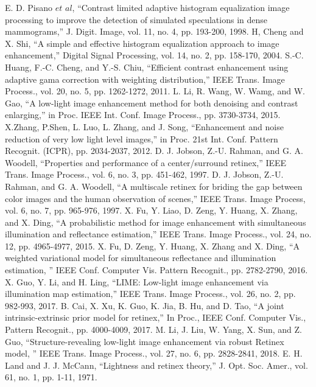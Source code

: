 \begin{thebibliography}{99}
 E. D. Pisano $et$ $al$, ``Contrast limited adaptive histogram equalization image processing to improve the detection of simulated speculations in dense mammograms,'' J. Digit. Image, vol. 11, no. 4, pp. 193-200, 1998.
 H, Cheng and X. Shi, ``A simple and effective histogram equalization approach to image enhancement,'' Digital Signal Processing, vol. 14, no. 2, pp. 158-170, 2004.
 S.-C. Huang, F.-C. Cheng, and Y.-S. Chiu, ``Efficient contrast enhancement using adaptive gama correction with weighting distribution,'' IEEE Trans. Image Process., vol. 20, no. 5, pp. 1262-1272, 2011.
 L. Li, R. Wang, W. Wamg, and W. Gao, ``A low-light image enhancement method for both denoising and contrast enlarging,'' in Proc. IEEE Int. Conf. Image Process., pp. 3730-3734, 2015.
 X.Zhang, P.Shen, L. Luo, L. Zhang, and J. Song, ``Enhancement and noise reduction of very low light level images,'' in Proc. 21st Int. Conf. Pattern Recognit. (ICPR), pp. 2034-2037, 2012. 
 D. J. Jobson, Z.-U. Rahman, and G. A. Woodell, ``Properties and performance of a center/surround retinex,'' IEEE Trans. Image Process., vol. 6, no. 3, pp. 451-462, 1997.
 D. J. Jobson, Z.-U. Rahman, and G. A. Woodell, ``A multiscale retinex for briding the gap between color images and the human observation of scenes,'' IEEE Trans. Image Process, vol. 6, no. 7, pp. 965-976, 1997.
X. Fu, Y. Liao, D. Zeng, Y. Huang, X. Zhang, and X. Ding, ``A probabilistic method for image enhancement with simultaneous illumination and reflectance estimation,'' IEEE Trans. Image Process., vol. 24, no. 12, pp. 4965-4977, 2015.
X. Fu, D. Zeng, Y. Huang, X. Zhang and X. Ding, ``A weighted variational model for simultaneous reflectance and illumination estimation, '' IEEE Conf. Computer Vis. Pattern Recognit., pp. 2782-2790, 2016.
 X. Guo, Y. Li, and H. Ling, ``LIME: Low-light image enhancement via illumination map estimation,'' IEEE Trans. Image Process., vol. 26, no. 2, pp. 982-993, 2017. 
 B. Cai, X. Xu, K. Guo, K. Jia, B. Hu, and D. Tao, ``A joint intrinsic-extrinsic prior model for retinex,'' In Proc., IEEE Conf. Computer Vis., Pattern Recognit., pp. 4000-4009, 2017.
 M. Li, J. Liu, W. Yang, X. Sun, and Z. Guo, ``Structure-revealing low-light image enhancement via robust Retinex model, '' IEEE Trans. Image Process., vol. 27, no. 6, pp. 2828-2841, 2018.
 E. H. Land and J. J. McCann, ``Lightness and retinex theory,'' J. Opt. Soc. Amer., vol. 61, no. 1, pp. 1-11, 1971.

\end{thebibliography}
